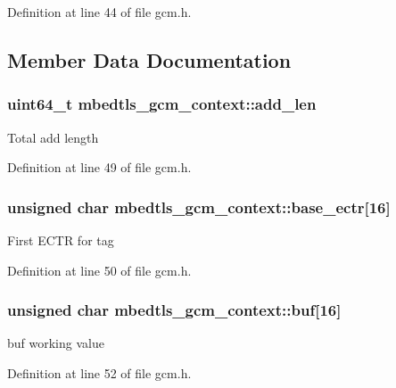 Definition at line 44 of file gcm.\-h.



\subsection{Member Data Documentation}
\hypertarget{structmbedtls__gcm__context_aabc65285117dd4b35998a328648faa20}{
\subsubsection[{add\-\_\-len}]{\setlength{\rightskip}{0pt plus 5cm}uint64\-\_\-t mbedtls\-\_\-gcm\-\_\-context\-::add\-\_\-len}}\label{structmbedtls__gcm__context_aabc65285117dd4b35998a328648faa20}
Total add length 

Definition at line 49 of file gcm.\-h.

\hypertarget{structmbedtls__gcm__context_a0ad9a8fb116959218c800b0bc3caeaba}{
\subsubsection[{base\-\_\-ectr}]{\setlength{\rightskip}{0pt plus 5cm}unsigned char mbedtls\-\_\-gcm\-\_\-context\-::base\-\_\-ectr\mbox{[}16\mbox{]}}}\label{structmbedtls__gcm__context_a0ad9a8fb116959218c800b0bc3caeaba}
First E\-C\-T\-R for tag 

Definition at line 50 of file gcm.\-h.

\hypertarget{structmbedtls__gcm__context_a772f2b1c947e9a3631f55b241c421aca}{
\subsubsection[{buf}]{\setlength{\rightskip}{0pt plus 5cm}unsigned char mbedtls\-\_\-gcm\-\_\-context\-::buf\mbox{[}16\mbox{]}}}\label{structmbedtls__gcm__context_a772f2b1c947e9a3631f55b241c421aca}
buf working value 

Definition at line 52 of file gcm.\-h.

